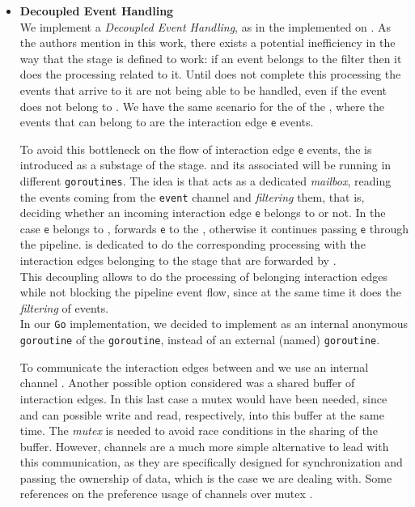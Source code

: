 \begin{itemize}

    \item \textbf{Decoupled Event Handling}\\
    We implement a \emph{Decoupled Event Handling}, as in the \DP implemented on \cite{DP-Benedi_Garcia_2024}. As the authors mention in this work, there exists a potential inefficiency in the way that the \filter \F stage is defined to work: if an event belongs to the filter then it does the processing related to it. Until \F does not complete this processing the events that arrive to it are not being able to be handled, even if the event does not belong to \F. We have the same scenario for the \DP of the \DPATM, where the events that can belong to \F are the interaction edge $\mathsf{e}$ events.

    To avoid this bottleneck on the flow of interaction edge $\mathsf{e}$ events, the \filterworker \FW is introduced as a substage of the \filter \F stage. \F and its associated \FW will be running in different \texttt{goroutines}. The idea is that \F acts as a dedicated \textit{mailbox}, reading the events coming from the \texttt{event} channel and \emph{filtering} them, that is, deciding whether an incoming interaction edge $\mathsf{e}$ belongs to \F or not. In the case $\mathsf{e}$ belongs to \F, \F forwards $\mathsf{e}$ to the \FW, otherwise it continues passing $\mathsf{e}$ through the pipeline. \FW is dedicated to do the corresponding processing with the interaction edges belonging to the stage that are forwarded by \F.\\

    This decoupling allows to do the processing of belonging interaction edges while not blocking the pipeline event flow, since at the same time it does the \emph{filtering} of events.\\

    In our \texttt{Go} implementation, we decided to implement \FW as an internal anonymous \texttt{goroutine} of the \F \texttt{goroutine}, instead of an external (named) \texttt{goroutine}. 

    To communicate the interaction edges between \F and \FW we use an internal channel \internaledgech. Another possible option considered was a shared buffer of interaction edges. In this last case a mutex would have been needed, since \F and \FW can possible write and read, respectively, into this buffer at the same time. The \textit{mutex} is needed to avoid race conditions in the sharing of the buffer. 
    However, channels are a much more simple alternative to lead with this communication, as they are specifically designed for synchronization and passing the ownership of data, which is the case we are dealing with. Some references on the preference usage of channels over mutex \cite{Go-channels-mutex-gowiki_mutex_channel, Go-channels-mutex-stackoverflow_mutex_channel}.


\end{itemize}
